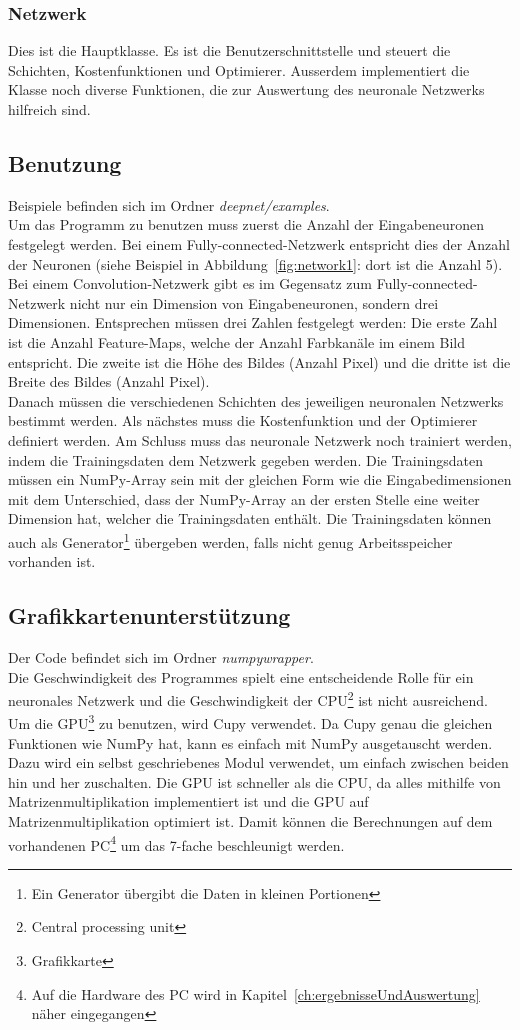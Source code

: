 \documentclass[12pt,a4paper]{report}
\begin{document}
\subsubsection{Netzwerk}
Dies ist die Hauptklasse.
Es ist die Benutzerschnittstelle und
steuert die Schichten, Kostenfunktionen und Optimierer.
Ausserdem implementiert die Klasse noch diverse Funktionen, die zur Auswertung des neuronale Netzwerks hilfreich sind.

\subsection{Benutzung}
Beispiele befinden sich im Ordner \textit{deepnet/examples}.\bigskip\\
Um das Programm zu benutzen muss zuerst die Anzahl der Eingabeneuronen festgelegt werden.
Bei einem Fully-connected-Netzwerk entspricht dies der Anzahl der Neuronen (siehe Beispiel in Abbildung~\ref{fig:network1}: dort ist die Anzahl 5).
Bei einem Convolution-Netzwerk gibt es im Gegensatz zum Fully-connected-Netzwerk nicht nur ein Dimension von Eingabeneuronen, sondern drei Dimensionen.
Entsprechen müssen drei Zahlen festgelegt werden:
Die erste Zahl ist die Anzahl Feature-Maps, welche der Anzahl Farbkanäle im einem Bild entspricht.
Die zweite ist die Höhe des Bildes (Anzahl Pixel) und die dritte ist die Breite des Bildes (Anzahl Pixel).\bigskip\\
Danach müssen die verschiedenen Schichten des jeweiligen neuronalen Netzwerks bestimmt werden.
Als nächstes muss die Kostenfunktion und der Optimierer definiert werden.
Am Schluss muss das neuronale Netzwerk noch trainiert werden, indem die Trainingsdaten dem Netzwerk gegeben werden.
Die Trainingsdaten müssen ein NumPy-Array sein mit der gleichen Form wie die Eingabedimensionen mit dem Unterschied,
dass der NumPy-Array an der ersten Stelle eine weiter Dimension hat, welcher die Trainingsdaten enthält.
Die Trainingsdaten können auch als Generator\footnote{Ein Generator übergibt die Daten in kleinen Portionen} übergeben werden,
falls nicht genug Arbeitsspeicher vorhanden ist.

\subsection{Grafikkartenunterstützung}
Der Code befindet sich im Ordner \textit{numpywrapper}.\bigskip\\
Die Geschwindigkeit des Programmes spielt eine entscheidende Rolle für ein
neuronales Netzwerk und die Geschwindigkeit der CPU\footnote{Central processing unit} ist nicht ausreichend.
Um die GPU\footnote{Grafikkarte} zu benutzen, wird Cupy verwendet.
Da Cupy genau die gleichen Funktionen wie NumPy hat, kann es einfach mit NumPy ausgetauscht werden.
Dazu wird ein selbst geschriebenes Modul verwendet, um einfach zwischen beiden hin und her zuschalten.
Die GPU ist schneller als die CPU, da alles mithilfe von Matrizenmultiplikation implementiert ist und
die GPU auf Matrizenmultiplikation optimiert ist.
Damit können die Berechnungen auf dem vorhandenen
PC\footnote{Auf die Hardware des PC wird in Kapitel~\ref{ch:ergebnisseUndAuswertung} näher eingegangen} um das 7-fache beschleunigt werden.
\end{document}
